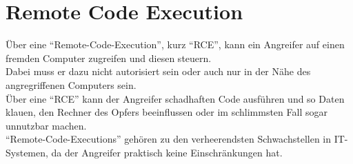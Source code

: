 \section{Remote Code Execution}\label{sec:remote-code-execution}

Über eine "`Remote-Code-Execution"', kurz "`RCE"', kann ein Angreifer auf einen fremden Computer zugreifen und diesen steuern.\\

Dabei muss er dazu nicht autorisiert sein oder auch nur in der Nähe des angregriffenen Computers sein.\\

Über eine "`RCE"' kann der Angreifer schadhaften Code ausführen und so Daten klauen, den Rechner des Opfers beeinflussen oder im schlimmsten Fall sogar unnutzbar machen.\\

"`Remote-Code-Executions"' gehören zu den verheerendsten Schwachstellen in IT-Systemen, da der Angreifer praktisch keine Einschränkungen hat.
